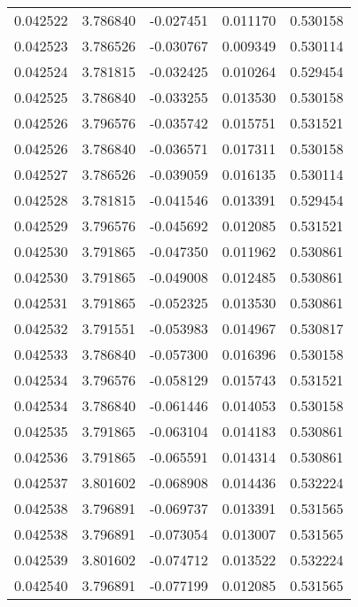 \begin{tabular}{lrrrr}
0.042522    &  3.786840 & -0.027451 &  0.011170 &             0.530158 \\
0.042523    &  3.786526 & -0.030767 &  0.009349 &             0.530114 \\
0.042524    &  3.781815 & -0.032425 &  0.010264 &             0.529454 \\
0.042525    &  3.786840 & -0.033255 &  0.013530 &             0.530158 \\
0.042526    &  3.796576 & -0.035742 &  0.015751 &             0.531521 \\
0.042526    &  3.786840 & -0.036571 &  0.017311 &             0.530158 \\
0.042527    &  3.786526 & -0.039059 &  0.016135 &             0.530114 \\
0.042528    &  3.781815 & -0.041546 &  0.013391 &             0.529454 \\
0.042529    &  3.796576 & -0.045692 &  0.012085 &             0.531521 \\
0.042530    &  3.791865 & -0.047350 &  0.011962 &             0.530861 \\
0.042530    &  3.791865 & -0.049008 &  0.012485 &             0.530861 \\
0.042531    &  3.791865 & -0.052325 &  0.013530 &             0.530861 \\
0.042532    &  3.791551 & -0.053983 &  0.014967 &             0.530817 \\
0.042533    &  3.786840 & -0.057300 &  0.016396 &             0.530158 \\
0.042534    &  3.796576 & -0.058129 &  0.015743 &             0.531521 \\
0.042534    &  3.786840 & -0.061446 &  0.014053 &             0.530158 \\
0.042535    &  3.791865 & -0.063104 &  0.014183 &             0.530861 \\
0.042536    &  3.791865 & -0.065591 &  0.014314 &             0.530861 \\
0.042537    &  3.801602 & -0.068908 &  0.014436 &             0.532224 \\
0.042538    &  3.796891 & -0.069737 &  0.013391 &             0.531565 \\
0.042538    &  3.796891 & -0.073054 &  0.013007 &             0.531565 \\
0.042539    &  3.801602 & -0.074712 &  0.013522 &             0.532224 \\
0.042540    &  3.796891 & -0.077199 &  0.012085 &             0.531565 \\

\end{tabular}
